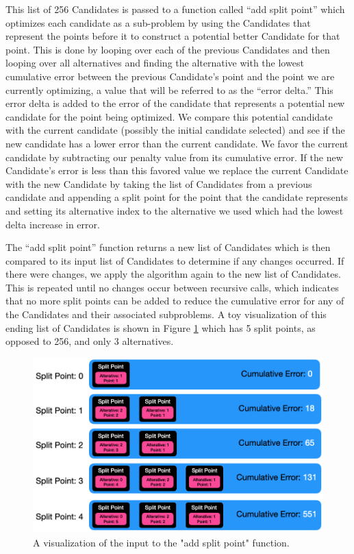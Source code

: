 \documentclass{article}
\begin{document}
This list of 256 Candidates is passed to a function called “add split point” which optimizes each candidate as a sub-problem by using the Candidates that represent the points before it to construct a potential better Candidate for that point. This is done by looping over each of the previous Candidates and then looping over all alternatives and finding the alternative with the lowest cumulative error between the previous Candidate’s point and the point we are currently optimizing, a value that will be referred to as the “error delta.” This error delta is added to the error of the candidate that represents a potential new candidate for the point being optimized. We compare this potential candidate with the current candidate (possibly the initial candidate selected) and see if the new candidate has a lower error than the current candidate. We favor the current candidate by subtracting our penalty value from its cumulative error. If the new Candidate’s error is less than this favored value we replace the current Candidate with the new Candidate by taking the list of Candidates from a previous candidate and appending a split point for the point that the candidate represents and setting its alternative index to the alternative we used which had the lowest delta increase in error.

The “add split point” function returns a new list of Candidates which is then compared to its input list of Candidates to determine if any changes occurred. If there were changes, we apply the algorithm again to the new list of Candidates. This is repeated until no changes occur between recursive calls, which indicates that no more split points can be added to reduce the cumulative error for any of the Candidates and their associated subproblems. A toy visualization of this ending list of Candidates is shown in Figure \ref{fig:candidate-list} which has 5 split points, as opposed to 256, and only 3 alternatives.

\begin{figure}[htbp]
\begin{center}
\includegraphics[scale=0.5]{candidate-list.png}
\caption{A visualization of the input to the "add split point" function.}
\label{fig:candidate-list}
\end{center}
\end{figure}
\end{document}
